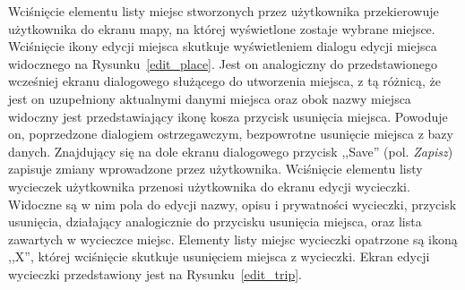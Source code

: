         Wciśnięcie elementu listy miejsc stworzonych przez użytkownika przekierowuje użytkownika do ekranu mapy, na której wyświetlone zostaje wybrane miejsce.
        Wciśnięcie ikony edycji miejsca skutkuje wyświetleniem dialogu edycji miejsca widocznego na Rysunku~\ref{edit_place}. Jest on analogiczny do przedstawionego wcześniej 
        ekranu dialogowego służącego do utworzenia miejsca, z tą różnicą, że jest on uzupełniony aktualnymi danymi miejsca oraz obok nazwy miejsca widoczny jest 
        przedstawiający ikonę kosza przycisk usunięcia miejsca. Powoduje on, poprzedzone dialogiem ostrzegawczym, bezpowrotne usunięcie miejsca z bazy danych.
        Znajdujący się na dole ekranu dialogowego przycisk ,,Save'' (pol. \emph{Zapisz}) zapisuje zmiany wprowadzone przez użytkownika. Wciśnięcie elementu listy wycieczek
        użytkownika przenosi użytkownika do ekranu edycji wycieczki. Widoczne są w nim pola do edycji nazwy, opisu i prywatności wycieczki, przycisk usunięcia, działający
        analogicznie do przycisku usunięcia miejsca, oraz lista zawartych w wycieczce miejsc. Elementy listy miejsc wycieczki opatrzone są ikoną ,,X'', której wciśnięcie
        skutkuje usunięciem miejsca z wycieczki. Ekran edycji wycieczki przedstawiony jest na Rysunku~\ref{edit_trip}.

